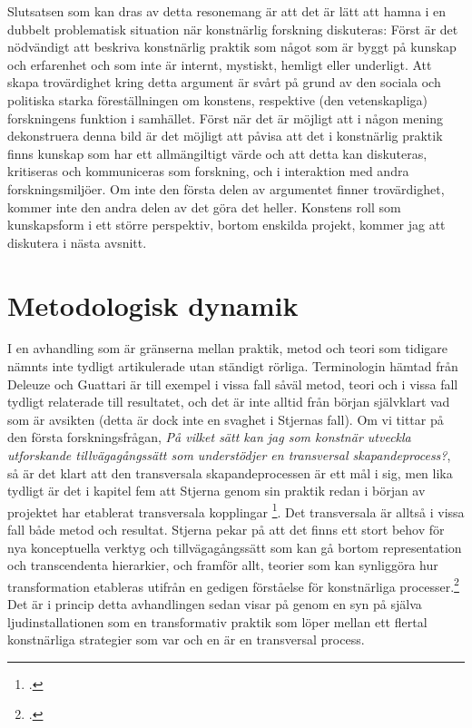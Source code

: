 \documentclass[11pt]{article}
\begin{document}
Slutsatsen som kan dras av detta resonemang är att det är lätt att
hamna i en dubbelt problematisk situation när konstnärlig forskning
diskuteras: Först är det nödvändigt att beskriva konstnärlig praktik
som något som är byggt på kunskap och erfarenhet och som inte är
internt, mystiskt, hemligt eller underligt. Att skapa trovärdighet
kring detta argument är svårt på grund av den sociala och politiska
starka föreställningen om konstens, respektive (den vetenskapliga)
forskningens funktion i samhället. Först när det är möjligt att i
någon mening dekonstruera denna bild är det möjligt att påvisa att det
i konstnärlig praktik finns kunskap som har ett allmängiltigt värde
och att detta kan diskuteras, kritiseras och kommuniceras som
forskning, och i interaktion med andra forskningsmiljöer. Om inte den
första delen av argumentet finner trovärdighet, kommer inte den andra
delen av det göra det heller. Konstens roll som kunskapsform i ett
större perspektiv, bortom enskilda projekt, kommer jag att diskutera i
nästa avsnitt.

\section*{Metodologisk dynamik}
\label{sec:org463364d}
I en avhandling som  är gränserna mellan
praktik, metod och teori som tidigare nämnts inte tydligt artikulerade
utan ständigt rörliga. Terminologin hämtad från Deleuze och Guattari
är till exempel i vissa fall såväl metod, teori och i vissa fall
tydligt relaterade till resultatet, och det är inte alltid från början
självklart vad som är avsikten (detta är dock inte en svaghet i
Stjernas fall). Om vi tittar på den första forskningsfrågan, \emph{På
    vilket sätt kan jag som konstnär utveckla utforskande
    tillvägagångssätt som understödjer en transversal
    skapandeprocess?}, så är det klart att den transversala
skapandeprocessen är ett mål i sig, men lika tydligt är det i kapitel
fem att Stjerna genom sin praktik redan i början av projektet
har etablerat transversala kopplingar \footcite[sid. 145]{Stjerna2018}. Det
transversala är alltså i vissa fall både metod och resultat. Stjerna
pekar på att det finns ett stort behov för nya konceptuella verktyg
och tillvägagångssätt som kan gå bortom representation och
transcendenta hierarkier, och framför allt, teorier som kan synliggöra
hur transformation etableras utifrån en gedigen förståelse för
konstnärliga processer.\footcite[sid. 85]{Stjerna2018} Det är i princip
detta avhandlingen sedan visar på genom en syn på själva
ljudinstallationen som en transformativ praktik som löper mellan ett
flertal konstnärliga strategier som var och en är en transversal
process.
\end{document}
